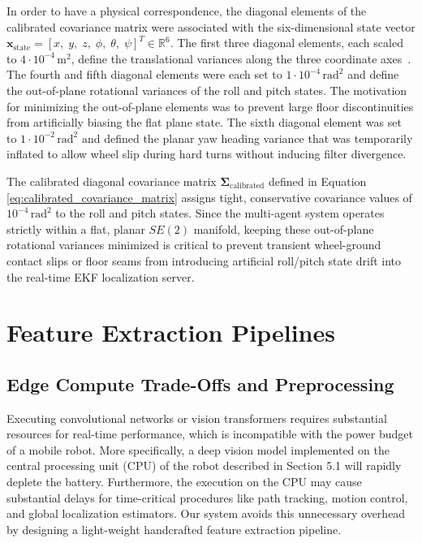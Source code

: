 In order to have a physical correspondence, the diagonal elements of the calibrated covariance matrix were associated with the six-dimensional state vector $\mathbf{x}_{\text{state}} = [x,\allowbreak \; y,\allowbreak \; z,\allowbreak \; \phi,\allowbreak \; \theta,\allowbreak \; \psi]^T \in \mathbb{R}^6$. The first three diagonal elements, each scaled to $4\cdot10^{-4}\,\text{m}^2$, define the translational variances along the three coordinate axes~\cite{brossard2022associating}. The fourth and fifth diagonal elements were each set to $1\cdot10^{-4}\,\text{rad}^2$ and define the out-of-plane rotational variances of the roll and pitch states. The motivation for minimizing the out-of-plane elements was to prevent large floor discontinuities from artificially biasing the flat plane state. The sixth diagonal element was set to $1\cdot10^{-2}\,\text{rad}^2$ and defined the planar yaw heading variance that was temporarily inflated to allow wheel slip during hard turns without inducing filter divergence.

The calibrated diagonal covariance matrix $\boldsymbol{\Sigma}_{\text{calibrated}}$ defined in Equation \ref{eq:calibrated_covariance_matrix} assigns tight, conservative covariance values of $10^{-4}\,\text{rad}^2$ to the roll and pitch states. Since the multi-agent system operates strictly within a flat, planar $SE(2)$ manifold, keeping these out-of-plane rotational variances minimized is critical to prevent transient wheel-ground contact slips or floor seams from introducing artificial roll/pitch state drift into the real-time EKF localization server.

\section{Feature Extraction Pipelines}

\subsection{Edge Compute Trade-Offs and Preprocessing}

Executing convolutional networks or vision transformers requires substantial resources for real-time performance, which is incompatible with the power budget of a mobile robot. More specifically, a deep vision model implemented on the central processing unit (CPU) of the robot described in Section 5.1 will rapidly deplete the battery. Furthermore, the execution on the CPU may cause substantial delays for time-critical procedures like path tracking, motion control, and global localization estimators. Our system avoids this unnecessary overhead by designing a light-weight handcrafted feature extraction pipeline.

